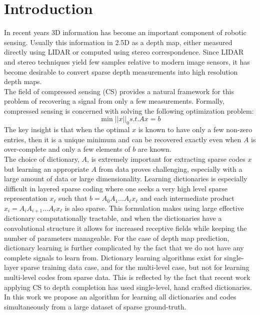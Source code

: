 \section{Introduction}
    In recent years 3D information has become an important component of robotic sensing. Usually this information in 2.5D as a depth map, either measured directly using LIDAR or computed using stereo correspondence. Since LIDAR and stereo techniques yield few samples relative to modern image sensors, it has become desirable to convert sparse depth measurements into high resolution depth maps.\\
  The field of compressed sensing (CS) provides a natural framework for this  problem of recovering a signal from only a few measurements. Formally, compressed sensing is concerned with solving the following optimization problem:
  \begin{equation}
    \label{eq:1}
    \min \left||x\right||_0 s.t. Ax = b
  \end{equation}
  The key insight is that when the optimal $x$ is known to have only a few non-zero entries, then it is a unique minimum and can be recovered exactly even when $A$ is over-complete and only a few elements of $b$ are known.\\
  The choice of dictionary, $A$, is extremely important for extracting sparse codes $x$ but learning an appropriate $A$ from data proves challenging, especially with a large amount of data or large dimensionality. Learning dictionaries is especially difficult in layered sparse coding where one seeks a very high level sparse representation $x_{\ell}$ such that $b = A_0A_1\ldots A_{\ell}x_{\ell}$ and each intermediate product $x_i = A_iA_{i+1}\ldots A_{\ell}x_{\ell}$ is also sparse. This formulation makes using large effective dictionary computationally tractable, and when the dictionaries have a convolutional structure it allows for increased receptive fields while keeping the number of parameters manageable. For the case of depth map prediction, dictionary learning is further complicated by the fact that we do not have any complete signals to learn from. Dictionary learning algorithms exist for single-layer sparse training data case, and for the multi-level case, but not for learning multi-level codes from sparse data. This is reflected by the fact that recent work applying CS to depth completion has used single-level, hand crafted dictionaries. In this work we propose an algorithm for learning all dictionaries and codes simultaneously from a large dataset of sparse ground-truth.\\
